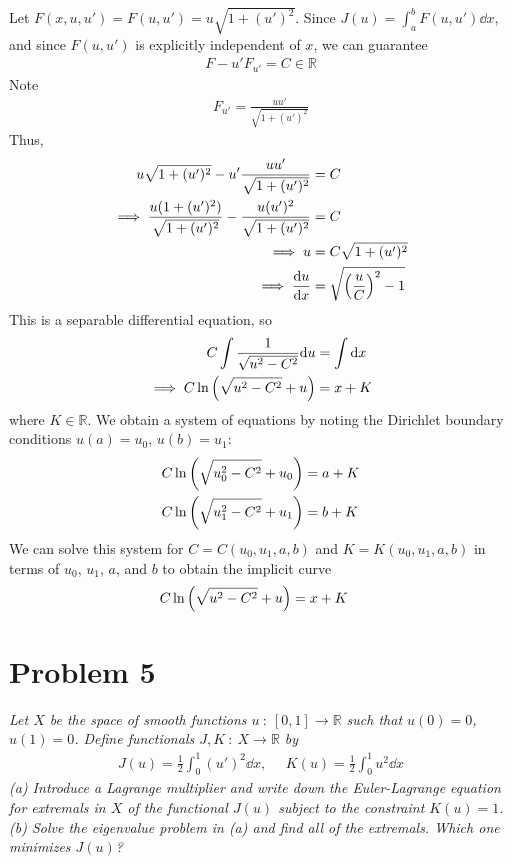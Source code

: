 \documentclass[12pt]{article}
\theoremstyle{plain}
\begin{document}
Let $F(x, u, u') = F(u, u') = u\sqrt{1 + (u')^2}$.  Since $J(u) = \int_a^b F(u, u') \dd x$, and since $F(u, u')$ is explicitly independent of $x$, we can guarantee
\begin{align*}
    F - u'F_{u'} = C \in \mathbb{R}
\end{align*}
Note
\begin{align*}
    F_{u'} = \frac{u u'}{\sqrt{1 + (u')^2}}
\end{align*}
Thus,
\begin{align*}
    u\sqrt{1 + (u')^2} - u'\frac{u u'}{\sqrt{1 + (u')^2}} &= C \\
    \implies \frac{u(1 + (u')^2)}{\sqrt{1 + (u')^2}} - \frac{u (u')^2}{\sqrt{1 + (u')^2}} &= C \\
    \implies u &= C\sqrt{1 + (u')^2} \\
    \implies \frac{\dd u}{\dd x} &= \sqrt{\qty(\frac{u}{C})^2 - 1}
\end{align*}
This is a separable differential equation, so
\begin{align*}
    C\int \frac{1}{\sqrt{u^2 - C^2}}\dd u &= \int \dd x \\
    \implies C\ln\qty(\sqrt{u^2 - C^2} + u) &= x + K
\end{align*}
where $K \in \mathbb{R}$.  We obtain a system of equations by noting the Dirichlet boundary conditions $u(a) = u_0$, $u(b) = u_1$:
\begin{align*}
    C\ln\qty(\sqrt{u_0^2 - C^2} + u_0) &= a + K \\
    C\ln\qty(\sqrt{u_1^2 - C^2} + u_1) &= b + K
\end{align*}
We can solve this system for $C = C(u_0, u_1, a, b)$ and $K = K(u_0, u_1, a, b)$ in terms of $u_0$, $u_1$, $a$, and $b$ to obtain the implicit curve
\begin{align*}
    C\ln\qty(\sqrt{u^2 - C^2} + u) &= x + K
\end{align*}

\section*{Problem 5}
\textit{Let $X$ be the space of smooth functions $u\ :\ [0,1] \rightarrow \mathbb{R}$ such that $u(0) = 0$, $u(1) = 0$.  Define functionals $J,K\ :\ X \rightarrow \mathbb{R}$ by}
\begin{align*}
    J(u) = \frac{1}{2}\int_0^1(u')^2 \dd x, \ \ \ \ \ \ K(u) = \frac{1}{2}\int_0^1 u^2 \dd x
\end{align*}
\textit{(a) Introduce a Lagrange multiplier and write down the Euler-Lagrange equation for extremals in $X$ of the functional $J(u)$ subject to the constraint $K(u) = 1$.\\
(b) Solve the eigenvalue problem in (a) and find all of the extremals.  Which one minimizes $J(u)$?} \\
\end{document}
